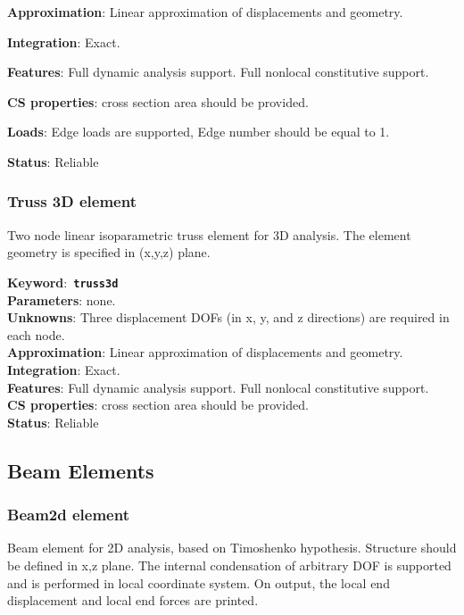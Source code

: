 \documentclass[a4paper]{article}
\newcommand{\descitem}[1]{{\noindent \bf #1}:}
\newcommand{\elemkeyword}[1]{\descitem{Keyword}~{\bf \texttt{#1}}}
\begin{document}
\descitem{Approximation} Linear approximation of displacements and geometry.

\descitem{Integration} Exact.

\descitem{Features} Full dynamic analysis support. Full nonlocal
constitutive support.

\descitem{CS properties} cross section area should be
provided.

\descitem{Loads} Edge loads are supported, Edge number should be equal
to 1.

\descitem{Status} Reliable


\subsubsection{Truss 3D element}
\label{Truss3d}

Two node linear isoparametric truss element for 3D analysis. The
element geometry is specified in (x,y,z) plane. 

\elemkeyword{truss3d}\\
\descitem{Parameters} none.\\

\descitem{Unknowns}
Three displacement DOFs (in x, y, and z directions) are required
in each node.\\
\descitem{Approximation} Linear approximation of displacements and geometry.\\
\descitem{Integration} Exact.\\
\descitem{Features} Full dynamic analysis support. Full nonlocal
constitutive support.\\
\descitem{CS properties} cross section area should be
provided.\\
\descitem{Status} Reliable



\subsection{Beam Elements}
\subsubsection{Beam2d element}
Beam element for 2D analysis, based on Timoshenko hypothesis. Structure should be defined in x,z
plane. The internal condensation
of arbitrary DOF is supported and is performed in local coordinate
system. On output, the local end displacement and local end forces are
printed. 
\end{document}
